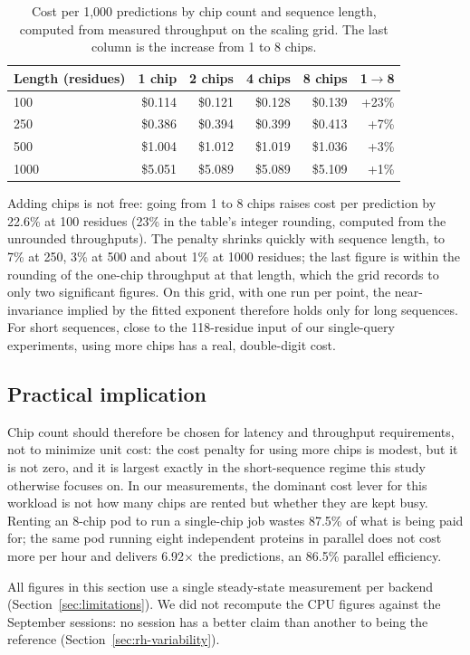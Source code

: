 \begin{table}[H]
\centering\small
\caption{Cost per 1{,}000 predictions by chip count and sequence length,
computed from measured throughput on the scaling grid. The last column
is the increase from 1 to 8 chips.}
\label{tab:cost-scaling}
\begin{tabular}{lrrrrr}
\toprule
Length (residues) & 1 chip & 2 chips & 4 chips & 8 chips & 1$\to$8 \\
\midrule
100  & \$0.114 & \$0.121 & \$0.128 & \$0.139 & +23\% \\
250  & \$0.386 & \$0.394 & \$0.399 & \$0.413 & +7\% \\
500  & \$1.004 & \$1.012 & \$1.019 & \$1.036 & +3\% \\
1000 & \$5.051 & \$5.089 & \$5.089 & \$5.109 & +1\% \\
\bottomrule
\end{tabular}
\end{table}

Adding chips is not free: going from 1 to 8 chips raises cost per
prediction by 22.6\% at 100 residues (23\% in the table's integer
rounding, computed from the unrounded throughputs). The penalty shrinks quickly with
sequence length, to 7\% at 250, 3\% at 500 and about 1\% at 1000
residues; the last figure is within the rounding of the one-chip
throughput at that length, which the grid records to only two
significant figures. On this grid, with one run per point, the
near-invariance implied by the fitted exponent therefore holds only for
long sequences. For short sequences, close to
the 118-residue input of our single-query experiments, using more chips
has a real, double-digit cost.

\subsection{Practical implication}
\label{sec:cost-implication}

Chip count should therefore be chosen for latency and throughput
requirements, not to minimize unit cost: the cost penalty for using
more chips is modest, but it is not zero, and it is largest exactly in
the short-sequence regime this study otherwise focuses on. In our
measurements, the dominant cost lever for this workload is not how
many chips are rented but whether they are kept busy. Renting an
8-chip pod
to run a single-chip job wastes 87.5\% of what is being paid for; the
same pod running eight independent proteins in parallel does not cost
more per hour and delivers 6.92$\times$ the predictions, an 86.5\%
parallel efficiency.

All figures in this section use a single steady-state measurement per
backend (Section~\ref{sec:limitations}). We did not recompute the CPU
figures against the September sessions: no session has a better claim
than another to being the reference
(Section~\ref{sec:rh-variability}).
